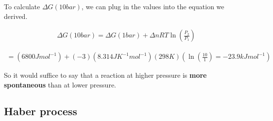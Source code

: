 \documentclass[12pt]{book}
\begin{document}
To calculate $\Delta G(10 bar)$, we can plug in the values into the equation we derived.

\begin{align*}
    \Delta G(10 bar)=\Delta G(1 bar)+\Delta nRT\ln\left(\frac{P_2}{P_1}\right)
\end{align*}

\begin{align*}
    =(6800Jmol^{-1})+(-3)(8.314JK^{-1}mol^{-1})(298K)(\ln\left(\frac{10}{1}\right)=-23.9kJmol^{-1})
\end{align*}

So it would suffice to say that a reaction at higher pressure is \textbf{more spontaneous} than at lower pressure.

\subsection*{Haber process}
\end{document}
